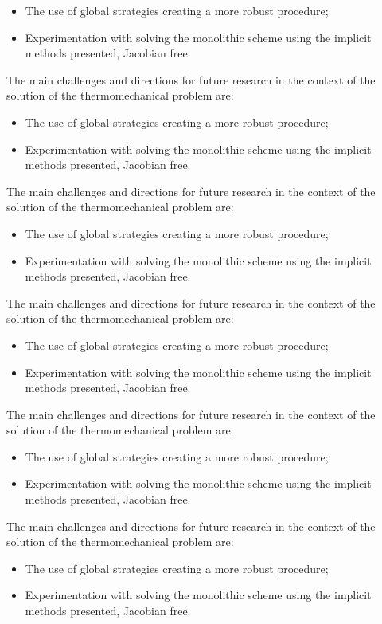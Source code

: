 \begin{itemize}
  \item The use of global strategies creating a more robust procedure;
  \item Experimentation with solving the monolithic scheme using the implicit methods presented, Jacobian free.
\end{itemize}
The main challenges and directions for future research in the context of the solution of the thermomechanical problem are:
\begin{itemize}
  \item The use of global strategies creating a more robust procedure;
  \item Experimentation with solving the monolithic scheme using the implicit methods presented, Jacobian free.
\end{itemize}
The main challenges and directions for future research in the context of the solution of the thermomechanical problem are:
\begin{itemize}
  \item The use of global strategies creating a more robust procedure;
  \item Experimentation with solving the monolithic scheme using the implicit methods presented, Jacobian free.
\end{itemize}
The main challenges and directions for future research in the context of the solution of the thermomechanical problem are:
\begin{itemize}
  \item The use of global strategies creating a more robust procedure;
  \item Experimentation with solving the monolithic scheme using the implicit methods presented, Jacobian free.
\end{itemize}
The main challenges and directions for future research in the context of the solution of the thermomechanical problem are:
\begin{itemize}
  \item The use of global strategies creating a more robust procedure;
  \item Experimentation with solving the monolithic scheme using the implicit methods presented, Jacobian free.
\end{itemize}
The main challenges and directions for future research in the context of the solution of the thermomechanical problem are:
\begin{itemize}
  \item The use of global strategies creating a more robust procedure;
  \item Experimentation with solving the monolithic scheme using the implicit methods presented, Jacobian free.
\end{itemize}
